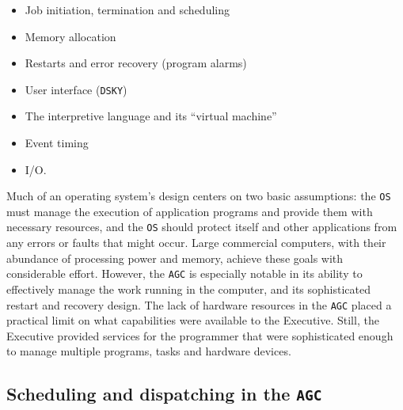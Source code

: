 \documentclass[refcap, oxford]{ahsan}
\begin{document}
\begin{itemize}
  \item Job initiation, termination and scheduling
  \item Memory allocation
  \item Restarts and error recovery (program alarms)
  \item User interface (\texttt{DSKY})
  \item The interpretive language and its ``virtual machine''
  \item Event timing
  \item I/O.
\end{itemize}

Much of an operating system's design centers on two basic assumptions: the \texttt{OS} must manage the execution of application programs and provide them with necessary resources, and the \texttt{OS} should protect itself and other applications from any errors or faults that might occur. Large commercial computers, with their abundance of processing power and memory, achieve these goals with considerable effort. However, the \texttt{AGC} is especially notable in its ability to effectively manage the work running in the computer, and its sophisticated restart and recovery design. The lack of hardware resources in the \texttt{AGC} placed a practical limit on what capabilities were available to the Executive. Still, the Executive provided services for the programmer that were sophisticated enough to manage multiple programs, tasks and hardware devices.

 
\subsection{Scheduling and dispatching in the \texttt{AGC}}
\end{document}
